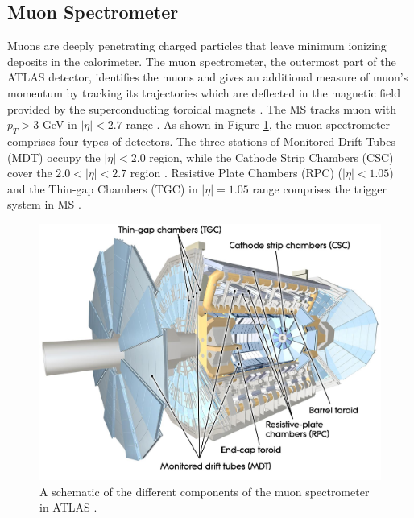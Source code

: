\subsection{Muon Spectrometer}
\label{subsec:MS}
Muons are deeply penetrating charged particles that leave minimum ionizing deposits in the calorimeter. The muon spectrometer, the outermost part of the ATLAS detector, identifies the muons and gives an additional measure of muon's momentum by tracking its trajectories which are deflected in the magnetic field provided by the superconducting toroidal magnets \cite{ATLAS}. The MS tracks muon with $p_{T} > 3$ GeV in $|\eta| < 2.7$ range \cite{ATLAS}. As shown in Figure \ref{fig:ATLAS_MS}, the muon spectrometer comprises four types of detectors. The three stations of Monitored Drift Tubes (MDT) occupy the $|\eta| < 2.0$ region, while the Cathode Strip Chambers (CSC) cover the $2.0 < |\eta| < 2.7$ region \cite{ATLAS}. Resistive Plate Chambers (RPC) ($|\eta| < 1.05$) and the Thin-gap Chambers (TGC) in $|\eta| = 1.05$ range comprises the trigger system in MS \cite{ATLAS}. 

\begin{figure}[!htbp]
    \centering
    \includegraphics[width=.98\linewidth]{figures/LHC/ATLAS_MS.jpeg}
    \caption{ A schematic of the different components of the muon spectrometer in ATLAS \cite{ATLAS}.\label{fig:ATLAS_MS}}
\end{figure}